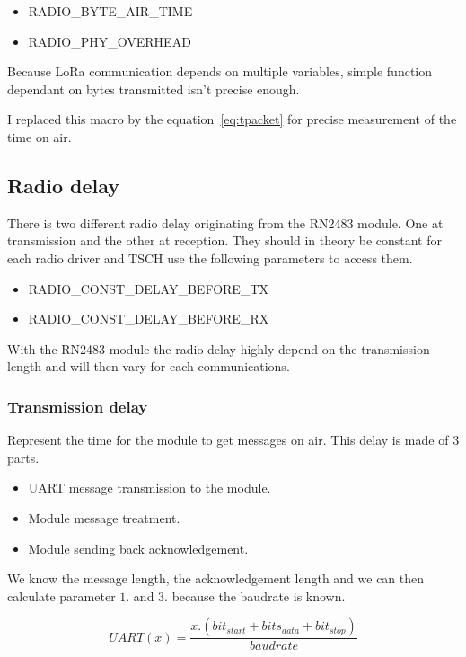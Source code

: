 \begin{itemize}
    \item RADIO\_BYTE\_AIR\_TIME
    \item RADIO\_PHY\_OVERHEAD
\end{itemize}

Because LoRa communication depends on multiple variables, simple function
dependant on bytes transmitted isn't precise enough.

I replaced this macro by the equation~\ref{eq:tpacket} for precise measurement
of the time on air.

\subsection{Radio delay}

There is two different radio delay originating from the RN2483 module.
One at transmission and the other at reception. 
They should in theory be constant for each radio driver and TSCH use the
following parameters to access them.

\begin{itemize}
  \item RADIO\_CONST\_DELAY\_BEFORE\_TX
  \item RADIO\_CONST\_DELAY\_BEFORE\_RX
\end{itemize}

With the RN2483 module the radio delay highly depend on the transmission length 
and will then vary for each communications.

\subsubsection{Transmission delay}

Represent the time for the module to get messages on air. 
This delay is made of 3 parts.

\begin{itemize}
  \item UART message transmission to the module.
  \item Module message treatment.
  \item Module sending back acknowledgement.
\end{itemize}

We know the message length, the acknowledgement length and we can then
calculate parameter $1.$ and $3.$ because the baudrate is known.

\begin{equation}
  \label{eq:baudrate}
  UART(x) = \frac{x . (bit_{start} + bits_{data} + bit_{stop})}{baudrate}
\end{equation}

